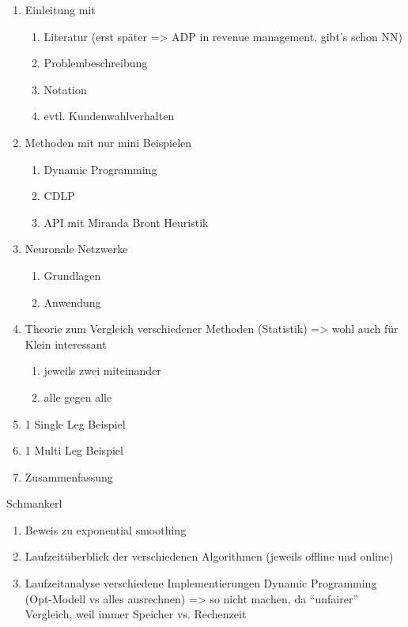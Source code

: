 \begin{enumerate}
	\item Einleitung mit 
	\begin{enumerate}
		\item Literatur (erst später => ADP in revenue management, gibt's schon NN)
		\item Problembeschreibung
		\item Notation
		\item evtl. Kundenwahlverhalten
	\end{enumerate} 
	\item Methoden mit nur mini Beispielen
	\begin{enumerate}
		\item Dynamic Programming
		\item CDLP
		\item API mit Miranda Bront Heuristik
	\end{enumerate}
	\item Neuronale Netzwerke
	\begin{enumerate}
		\item Grundlagen
		\item Anwendung
	\end{enumerate}
	\item Theorie zum Vergleich verschiedener Methoden (Statistik) => wohl auch für Klein interessant
	\begin{enumerate}
		\item jeweils zwei miteinander
		\item alle gegen alle
	\end{enumerate}
	\item 1 Single Leg Beispiel
	\item 1 Multi Leg Beispiel
	\item Zusammenfassung
\end{enumerate}

Schmankerl

\begin{enumerate}
	\item Beweis zu exponential smoothing
	\item Laufzeitüberblick der verschiedenen Algorithmen (jeweils offline und online)
	\item Laufzeitanalyse verschiedene Implementierungen Dynamic Programming (Opt-Modell vs alles ausrechnen) => so nicht machen, da \enquote{unfairer} Vergleich, weil immer Speicher vs. Rechenzeit
\end{enumerate}